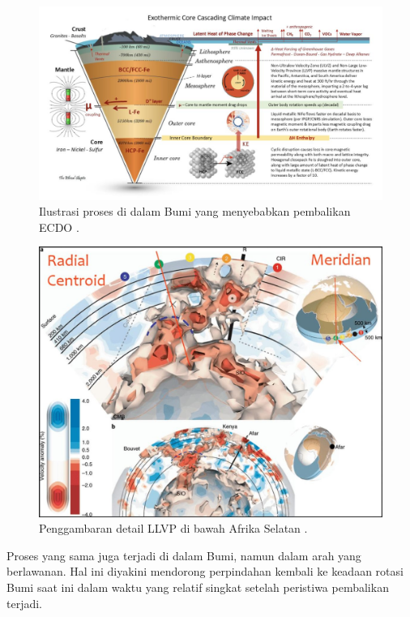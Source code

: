\documentclass[10pt,twocolumn,letterpaper]{article}
\begin{document}
\begin{figure}[t]
\begin{center}
\includegraphics[width=1\textwidth]{layers.jpg}
\end{center}
   \caption{Ilustrasi proses di dalam Bumi yang menyebabkan pembalikan ECDO \cite{129}.}
\label{fig:11}
\end{figure}
\begin{figure}[t]
\begin{center}
   \includegraphics[width=1\linewidth]{llvp.jpg}
\end{center}
   \caption{Penggambaran detail LLVP di bawah Afrika Selatan \cite{28}.}
\label{fig:12}
\label{fig:onecol}
\end{figure}

Proses yang sama juga terjadi di dalam Bumi, namun dalam arah yang berlawanan. Hal ini diyakini mendorong perpindahan kembali ke keadaan rotasi Bumi saat ini dalam waktu yang relatif singkat setelah peristiwa pembalikan terjadi.
\end{document}
